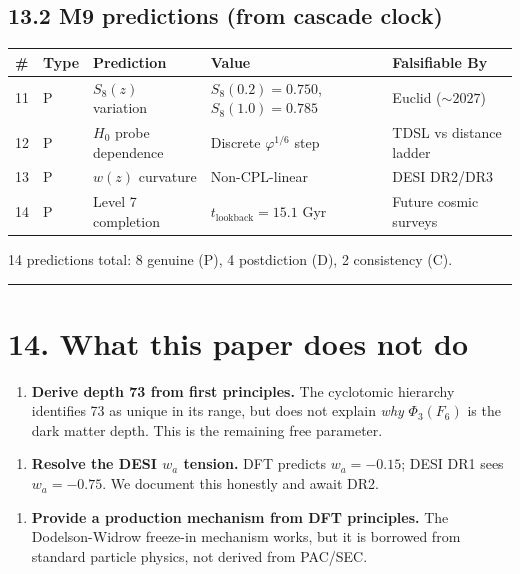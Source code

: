 \documentclass[11pt,a4paper]{article}
\providecommand{\tightlist}{\setlength{\itemsep}{0pt}\setlength{\parskip}{0pt}}
\begin{document}
\subsection*{13.2 M9 predictions (from cascade clock)}

\begin{longtable}[]{@{}lllll@{}}
\toprule
\# & Type & Prediction & Value & Falsifiable By \\
\midrule\endhead
11 & P & $S_8(z)$ variation & $S_8(0.2) = 0.750$, $S_8(1.0) = 0.785$ & Euclid ($\sim 2027$) \\
12 & P & $H_0$ probe dependence & Discrete $\varphi^{1/6}$ step & TDSL vs distance ladder \\
13 & P & $w(z)$ curvature & Non-CPL-linear & DESI DR2/DR3 \\
14 & P & Level 7 completion & $t_{\text{lookback}} = 15.1$ Gyr & Future cosmic surveys \\
\bottomrule
\end{longtable}

14 predictions total: 8 genuine (P), 4 postdiction (D), 2 consistency (C).

\begin{center}\rule{0.5\linewidth}{0.4pt}\end{center}

\section*{14. What this paper does not do}

\begin{enumerate}\tightlist
\item \textbf{Derive depth 73 from first principles.} The cyclotomic hierarchy identifies 73 as unique in its range, but does not explain \emph{why} $\Phi_3(F_6)$ is the dark matter depth. This is the remaining free parameter.
\end{enumerate}

\begin{enumerate}\tightlist
\item \textbf{Resolve the DESI $w_a$ tension.} DFT predicts $w_a = -0.15$; DESI DR1 sees $w_a = -0.75$. We document this honestly and await DR2.
\end{enumerate}

\begin{enumerate}\tightlist
\item \textbf{Provide a production mechanism from DFT principles.} The Dodelson-Widrow freeze-in mechanism works, but it is borrowed from standard particle physics, not derived from PAC/SEC.
\end{enumerate}
\end{document}
